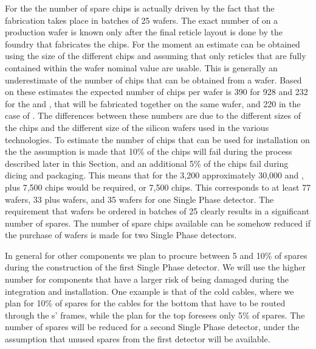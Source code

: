 For the  the number of
spare chips is actually driven by the fact that the fabrication
takes place in batches of 25 wafers. The exact number of  
on a production wafer is known only after the final reticle layout
is done by the foundry that fabricates the chips. For the moment
an estimate can be obtained using the size of the different 
chips and assuming that only reticles that are fully contained
within the wafer nominal value are usable. This is generally
an underestimate of the number of chips that can be obtained 
from a wafer. Based on these estimates the expected number
of chips per wafer is 390 for  928 and 232 for the 
and , that will be fabricated together on the same wafer,
and 220 in the case of . The differences between these
numbers are due to the different sizes of the chips and the
different size of the silicon wafers used in the various 
technologies. To estimate the number of chips that can be
used for installation on the  the assumption is
made that 10\% of the chips will fail during the 
process described later in this Section, and an additional
5\% of the chips fail during dicing and packaging. This means
that for the 3,200  approximately 30,000  and
, plus 7,500  chips would be required, or 7,500
 chips. This corresponds to at least 77  wafers,
33  plus  wafers, and 35  wafers for one
Single Phase detector. The requirement that wafers be ordered
in batches of 25 clearly results in a significant number of
spares. The number of spare chips available can be somehow
reduced if the purchase of wafers is made for two Single
Phase detectors. 

In general for other components we plan to procure between 5 and
10\% of spares during the construction of the first Single Phase
detector. We will use the higher number for components that have
a larger risk of being damaged during the integration and 
installation. One example is that of the cold cables, where we
plan for 10\% of spares for the cables for the bottom 
that have to be routed through the s' frames, while
the plan for the top  foresees only 5\% of spares.
The number of spares will be reduced for a second Single Phase
detector, under the assumption that unused spares from the first
detector will be available.

